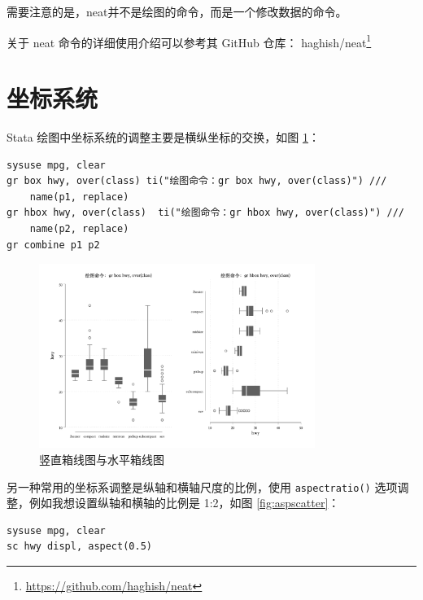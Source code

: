 \documentclass[]{ctexbook}
\renewcommand{\href}[2]{#2\footnote{\url{#1}}}
\begin{document}
需要注意的是，neat并不是绘图的命令，而是一个修改数据的命令。

关于 neat 命令的详细使用介绍可以参考其 GitHub 仓库： \href{https://github.com/haghish/neat}{haghish/neat}

\hypertarget{section-36}{%
\section{坐标系统}\label{section-36}}

Stata 绘图中坐标系统的调整主要是横纵坐标的交换，如图 \ref{fig:boxcombine}：

\begin{lstlisting}
sysuse mpg, clear
gr box hwy, over(class) ti("绘图命令：gr box hwy, over(class)") ///
    name(p1, replace)
gr hbox hwy, over(class)  ti("绘图命令：gr hbox hwy, over(class)") ///
    name(p2, replace)
gr combine p1 p2
\end{lstlisting}

\begin{figure}

{\centering \includegraphics[width=0.8\textwidth]{assets/boxcombine} 

}

\caption{竖直箱线图与水平箱线图}\label{fig:boxcombine}
\end{figure}

另一种常用的坐标系调整是纵轴和横轴尺度的比例，使用 \texttt{aspectratio()} 选项调整，例如我想设置纵轴和横轴的比例是 1:2，如图 \ref{fig:aspscatter}：

\begin{lstlisting}
sysuse mpg, clear
sc hwy displ, aspect(0.5)
\end{lstlisting}
\end{document}
